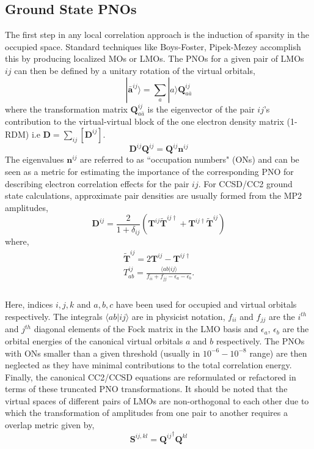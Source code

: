 \subsection{Ground State PNOs}
The first step in any local correlation approach is the induction of sparsity in the
occupied space. Standard techniques like Boys-Foster, Pipek-Mezey\cite{BoughtonPulay93} accomplish this by 
producing localized MOs or LMOs. The PNOs for a given pair of LMOs $ij$ can then be 
defined by a unitary rotation of the virtual orbitals,
\begin{equation}
|\bm{\bar{a}}^{ij}\rangle = \sum_a |a\rangle \bm{Q}^{ij}_{a\bar{a}}
\end{equation}
where the transformation matrix $\bm{Q}^{ij}_{a\bar{a}}$ is the eigenvector
of the pair $ij$'s contribution to the virtual-virtual block of the one
electron density matrix (1-RDM) i.e $\bm{D} = \sum\limits_{ij}[\bm{D}^{ij}]$.
\begin{equation}
\bm{D}^{ij} \bm{Q}^{ij} = \bm{Q}^{ij} \bm{n}^{ij}
\end{equation} 
The eigenvalues $\bm{n}^{ij}$ are referred to as ``occupation numbers" (ONs) and 
can be seen as a metric for estimating the importance of the corresponding PNO
for describing electron correlation effects for the pair $ij$. For CCSD/CC2 
ground state calculations, approximate pair densities are usually formed from 
the MP2 amplitudes,
\begin{equation}
\bm{D}^{ij} = \frac{2}{1+\delta_{ij}} (\bm{T}^{ij}\tilde{\bm{T}}^{ij\dagger} + \bm{T}^{ij\dagger}\tilde{\bm{T}}^{ij})
\end{equation}
where, 
\begin{equation}
\begin{split}
\tilde{\bm{T}}^{ij} = 2\bm{T}^{ij} - \bm{T}^{ij\dagger} \\
T^{ij}_{ab} = \frac{\langle ab|ij \rangle}{f_{ii} + f_{jj} - \epsilon_a - \epsilon_b}.\\
\end{split}
\end{equation} 
\\
Here, indices $i,j,k$ and $a,b,c$ have been used for occupied and virtual orbitals respectively. The 
integrals $\langle ab|ij \rangle$ are in physicist notation, $f_{ii}$ and $f_{jj}$ are the
$i^{th}$ and $j^{th}$ diagonal elements of the Fock matrix in the LMO basis and 
$\epsilon_a$, $\epsilon_b$ are the orbital energies of the canonical virtual orbitals
$a$ and $b$ respectively. The PNOs with ONs smaller than a given threshold (usually
in $10^{-6} - 10^{-8}$ range) are then neglected as they have minimal contributions
to the total correlation energy. Finally, the canonical CC2/CCSD equations are reformulated
or refactored in terms of these truncated PNO transformations. It should be noted that the virtual
spaces of different pairs of LMOs are non-orthogonal to each other due to which the transformation
of amplitudes from one pair to another requires a overlap metric given by, 
\begin{equation}
\bm{S}^{ij,kl} = {\bm{Q}^{ij}}^{\dagger} \bm{Q}^{kl}
\end{equation}
